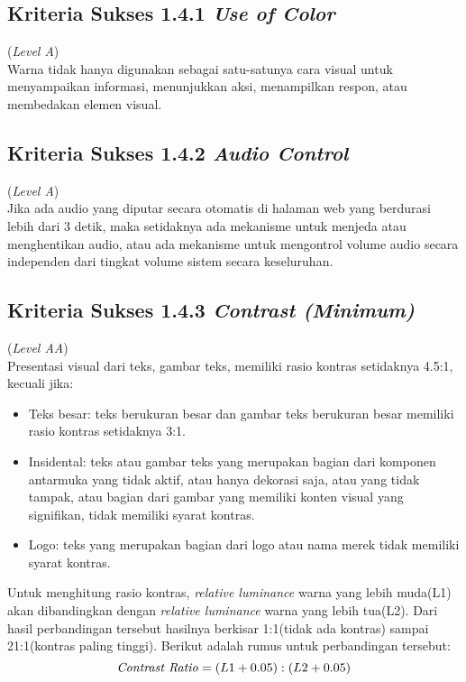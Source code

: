 \subsection{Kriteria Sukses 1.4.1 \textit{Use of Color}}
\label{subsec:kriteria_1.4.1}
(\textit{Level A}) \\

Warna tidak hanya digunakan sebagai satu-satunya cara visual untuk menyampaikan informasi, menunjukkan aksi, menampilkan respon, atau membedakan elemen visual.


\subsection{Kriteria Sukses 1.4.2 \textit{Audio Control}}
\label{subsec:kriteria_1.4.2}
(\textit{Level A}) \\

Jika ada audio yang diputar secara otomatis di halaman web yang berdurasi lebih dari 3 detik, maka setidaknya ada mekanisme untuk menjeda atau menghentikan audio, atau ada mekanisme untuk mengontrol volume audio secara independen dari tingkat volume sistem secara keseluruhan.


\subsection{Kriteria Sukses 1.4.3 \textit{Contrast (Minimum)}}
\label{subsec:kriteria_1.4.3}
(\textit{Level AA}) \\

Presentasi visual dari teks, gambar teks, memiliki rasio kontras setidaknya 4.5:1, kecuali jika:

\begin{itemize}
	\item Teks besar: teks berukuran besar dan gambar teks berukuran besar memiliki rasio kontras setidaknya 3:1.
	\item Insidental: teks atau gambar teks yang merupakan bagian dari komponen antarmuka yang tidak aktif, atau hanya dekorasi saja, atau yang tidak tampak, atau bagian dari gambar yang memiliki konten visual yang signifikan, tidak memiliki syarat kontras.
	\item Logo: teks yang merupakan bagian dari logo atau nama merek tidak memiliki syarat kontras.
\end{itemize}

Untuk menghitung rasio kontras, \textit{relative luminance} warna yang lebih muda(L1) akan dibandingkan dengan \textit{relative luminance} warna yang lebih tua(L2). Dari hasil perbandingan tersebut hasilnya berkisar 1:1(tidak ada kontras) sampai 21:1(kontras paling tinggi). Berikut adalah rumus untuk perbandingan tersebut:
\begin{equation}
\text{\textit{Contrast Ratio}} = (L1 + 0.05) : (L2 +0.05)
\end{equation}

